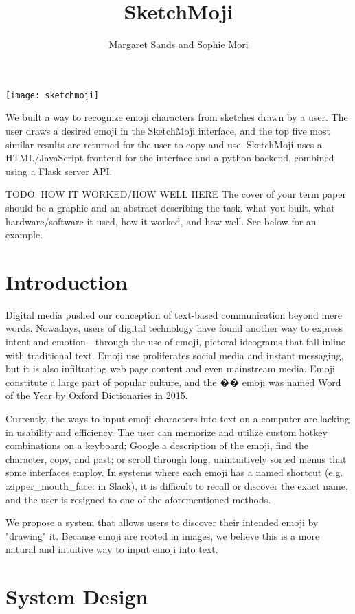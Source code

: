 \documentclass{article}
\title{SketchMoji}
\author{Margaret Sands and Sophie Mori}
\date{}
\begin{document}
\maketitle
\texttt{[image: sketchmoji]}

We built a way to recognize emoji characters from sketches drawn by a user. The user draws a desired emoji in the SketchMoji interface, and the top five most similar results are returned for the user to copy and use. SketchMoji uses a HTML/JavaScript frontend for the interface and a python backend, combined using a Flask server API.

TODO: HOW IT WORKED/HOW WELL HERE
The cover of your term paper should be a graphic and an abstract describing the task, what you built, what hardware/software it used, how it worked, and how well. See below for an example.

\section{Introduction}

Digital media pushed our conception of text-based communication beyond mere words. Nowadays, users of digital technology have found another way to express intent and emotion—through the use of emoji, pictoral ideograms that fall inline with traditional text. Emoji use proliferates social media and instant messaging, but it is also infiltrating web page content and even mainstream media. Emoji constitute a large part of popular culture, and the �� emoji was named Word of the Year by Oxford Dictionaries in 2015.

Currently, the ways to input emoji characters into text on a computer are lacking in usability and efficiency. The user can memorize and utilize custom hotkey combinations on a keyboard; Google a description of the emoji, find the character, copy, and past; or scroll through long, unintuitively sorted menus that some interfaces employ. In systems where each emoji has a named shortcut (e.g. :zipper\_mouth\_face: in Slack), it is difficult to recall or discover the exact name, and the user is resigned to one of the aforementioned methods.

We propose a system that allows users to discover their intended emoji by "drawing" it. Because emoji are rooted in images, we believe this is a more natural and intuitive way to input emoji into text.


\section{System Design}
\end{document}
